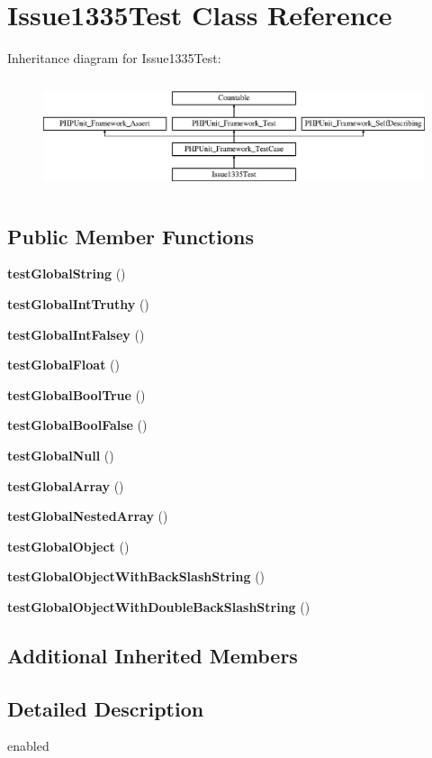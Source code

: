 \section{Issue1335\+Test Class Reference}
\label{class_issue1335_test}
Inheritance diagram for Issue1335\+Test\+:\begin{figure}[H]
\begin{center}
\leavevmode
\includegraphics[height=3.303835cm]{class_issue1335_test}
\end{center}
\end{figure}
\subsection*{Public Member Functions}
\begin{DoxyCompactItemize}
\item 
{\bf test\+Global\+String} ()
\item 
{\bf test\+Global\+Int\+Truthy} ()
\item 
{\bf test\+Global\+Int\+Falsey} ()
\item 
{\bf test\+Global\+Float} ()
\item 
{\bf test\+Global\+Bool\+True} ()
\item 
{\bf test\+Global\+Bool\+False} ()
\item 
{\bf test\+Global\+Null} ()
\item 
{\bf test\+Global\+Array} ()
\item 
{\bf test\+Global\+Nested\+Array} ()
\item 
{\bf test\+Global\+Object} ()
\item 
{\bf test\+Global\+Object\+With\+Back\+Slash\+String} ()
\item 
{\bf test\+Global\+Object\+With\+Double\+Back\+Slash\+String} ()
\end{DoxyCompactItemize}
\subsection*{Additional Inherited Members}


\subsection{Detailed Description}
enabled 

